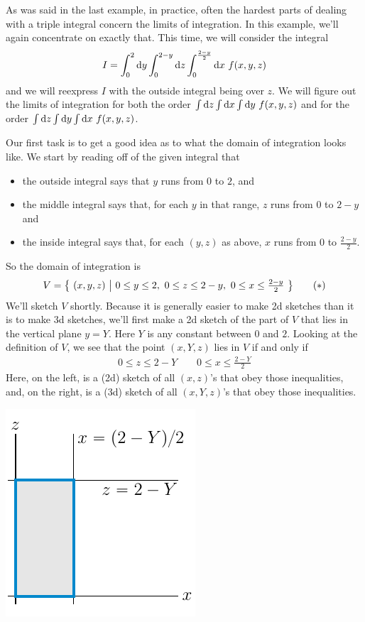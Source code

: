 \begin{eg}\label{eg 3d integrals exchange of order}
As was said in the last example, in practice, often the hardest parts of 
dealing with a triple integral concern the limits of integration.
In this example, we'll again concentrate on exactly that. This time, we will consider the integral
\begin{equation*}
I=\int_0^2\dee{y}\int_0^{2-y}\dee{z}\int_0^{\frac{2-y}{2}}\dee{x}\ f(x,y,z)
\end{equation*}
and we will reexpress $I$ with the outside integral being over $z$. We will 
figure out the limits of integration for both the order 
$\int\mathrm{d}z\int\mathrm{d}x\int\mathrm{d}y\ f(x,y,z)$ and for the order
$\int\dee{z}\int\dee{y}\int\dee{x}\ f(x,y,z)$.

Our first task is to get a good idea as to what the domain of integration looks like. We start by reading off of the given integral that
\begin{itemize} \itemsep1pt \parskip0pt 
\item
the outside integral says that $y$ runs from $0$ to $2$, and
\item
the middle integral says that, for each $y$ in that range, $z$ runs from $0$ to $2-y$ and
\item
the inside integral says that, for each $(y,z)$ as above,
$x$ runs from $0$ to $\frac{2-y}{2}$.
\end{itemize}
So the domain of integration is
\begin{equation*}
V=\Set{(x,y,z)}{ 0\le y\le 2,\ 
                 0\le z\le 2-y,\ 
                 0\le x\le \tfrac{2-y}{2}}
\tag{$*$}\end{equation*}
We'll sketch $V$ shortly. Because it is generally easier to make 2d sketches than it is to make 3d sketches, we'll first make a 2d sketch of the part of $V$ that lies in the vertical plane $y=Y$. Here $Y$ is any constant between 
$0$ and $2$. Looking at the definition of $V$, we see that the point $(x,Y,z)$ 
lies in $V$ if and only if
\begin{align*}
0\le z\le 2-Y\qquad   0\le x\le \frac{2-Y}{2}
\end{align*}
Here, on the left, is a (2d) sketch of all $(x,z)$'s that obey those
inequalities, and, on the right, is a (3d) sketch of all $(x,Y,z)$'s that obey those inequalities.
\begin{efig}
\begin{center}
    \includegraphics{figures/integration/xchange2.pdf}\qquad\qquad

\end{center}
\end{efig}
\end{eg}
